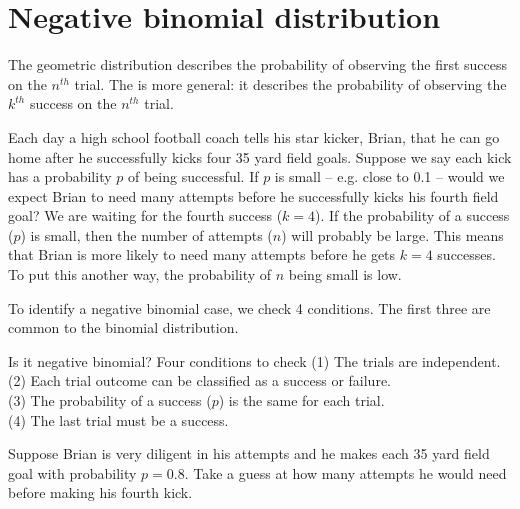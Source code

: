 \section{Negative binomial distribution}
\label{negativeBinomial}


The geometric distribution describes the probability of observing the first success on the $n^{th}$ trial. The  is more general: it describes the probability of observing the $k^{th}$ success on the $n^{th}$ trial.

\begin{examplewrap}
\begin{nexample}{Each day a high school football coach tells his star kicker, Brian, that he can go home after he successfully kicks four 35 yard field goals. Suppose we say each kick has a probability $p$ of being successful. If $p$ is small -- e.g. close to 0.1 -- would we expect Brian to need many attempts before he successfully kicks his fourth field goal?}
We are waiting for the fourth success ($k=4$). If the probability of a success ($p$) is small, then the number of attempts ($n$) will probably be large. This means that Brian is more likely to need many attempts before he gets $k=4$ successes. To put this another way, the probability of $n$ being small is low.
\end{nexample}
\end{examplewrap}

To identify a negative binomial case, we check 4 conditions. The first three are common to the binomial distribution.

\begin{onebox}{Is it negative binomial? Four conditions to check}
(1) The trials are independent. \\
(2) Each trial outcome can be classified as a success or failure. \\
(3) The probability of a success ($p$) is the same for each trial. \\
(4) The last trial must be a success.
\end{onebox}

\begin{exercisewrap}
\begin{nexercise}
Suppose Brian is very diligent in his attempts and he makes each 35 yard field goal with probability $p=0.8$. Take a guess at how many attempts he would need before making his fourth kick.\footnotemark
\end{nexercise}
\end{exercisewrap}

